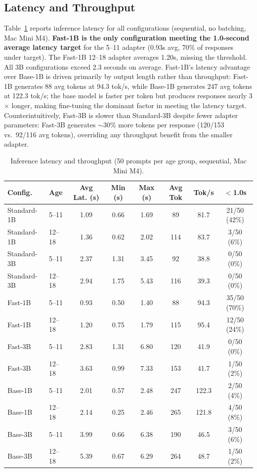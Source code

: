 \documentclass[ASNA,twocolumn]{USG} %
\begin{document}
\subsection{Latency and Throughput}

Table~\ref{tab:res3} reports inference latency for all configurations (sequential, no batching, Mac Mini M4). \textbf{Fast-1B is the only configuration meeting the 1.0-second average latency target} for the 5--11 adapter (0.93s avg, 70\% of responses under target). The Fast-1B 12--18 adapter averages 1.20s, missing the threshold. All 3B configurations exceed 2.3 seconds on average. Fast-1B's latency advantage over Base-1B is driven primarily by output length rather than throughput: Fast-1B generates 88 avg tokens at 94.3 tok/s, while Base-1B generates 247 avg tokens at 122.3 tok/s; the base model is faster per token but produces responses nearly 3$\times$ longer, making fine-tuning the dominant factor in meeting the latency target. Counterintuitively, Fast-3B is slower than Standard-3B despite fewer adapter parameters: Fast-3B generates $\sim$30\% more tokens per response (120/153 vs.\ 92/116 avg tokens), overriding any throughput benefit from the smaller adapter.

\begin{table}[!t]
  \caption{Inference latency and throughput (50 prompts per age group, sequential, Mac Mini M4).}
  \label{tab:res3}
  \small
  \begin{tabular}{llcccccc}
    \hline
    Config. & Age & Avg Lat. (s) & Min (s) & Max (s) & Avg Tok & Tok/s & $<$1.0s \\
    \hline
    Standard-1B & 5--11  & 1.09 & 0.66 & 1.69 & 89  & 81.7  & 21/50 (42\%) \\
    Standard-1B & 12--18 & 1.36 & 0.62 & 2.02 & 114 & 83.7  & 3/50 (6\%)   \\
    Standard-3B & 5--11  & 2.37 & 1.31 & 3.45 & 92  & 38.8  & 0/50 (0\%)   \\
    Standard-3B & 12--18 & 2.94 & 1.75 & 5.43 & 116 & 39.3  & 0/50 (0\%)   \\
    Fast-1B     & 5--11  & 0.93 & 0.50 & 1.40 & 88  & 94.3  & 35/50 (70\%) \\
    Fast-1B     & 12--18 & 1.20 & 0.75 & 1.79 & 115 & 95.4  & 12/50 (24\%) \\
    Fast-3B     & 5--11  & 2.83 & 1.31 & 6.80 & 120 & 41.9  & 0/50 (0\%)   \\
    Fast-3B     & 12--18 & 3.63 & 0.99 & 7.33 & 153 & 41.7  & 1/50 (2\%)   \\
    Base-1B     & 5--11  & 2.01 & 0.57 & 2.48 & 247 & 122.3 & 2/50 (4\%)   \\
    Base-1B     & 12--18 & 2.14 & 0.25 & 2.46 & 265 & 121.8 & 4/50 (8\%)   \\
    Base-3B     & 5--11  & 3.99 & 0.66 & 6.38 & 190 & 46.5  & 3/50 (6\%)   \\
    Base-3B     & 12--18 & 5.39 & 0.67 & 6.29 & 264 & 48.7  & 1/50 (2\%)   \\
    \hline
  \end{tabular}
\end{table}
\end{document}
